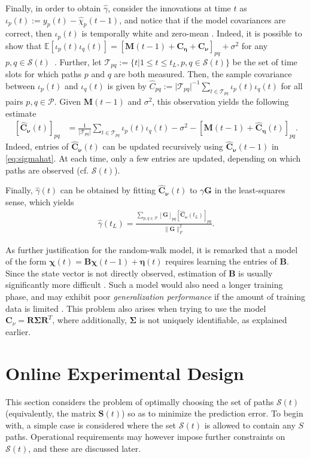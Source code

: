 \documentclass[draftcls,onecolumn,12pt]{IEEEtran}
\providecommand{\abs}[1]{\lvert#1\rvert}												\renewcommand{\b}[1]{\ensuremath{\mathbf{#1}}}		 							\newcommand{\bs}[1]{\ensuremath{\boldsymbol{#1}}}		 						\renewcommand{\c}[1]{\ensuremath{\mathcal{#1}}} 								\newcommand{\E}[1]{\ensuremath{\mathbb{E}\left[#1\right]}} 		  \newcommand{\Es}[1]{\ensuremath{\mathbb{E}^{*}\left[#1\right]}} \newcommand{\ind}{1\hspace{-1.6mm}1}														\newcommand{\norm}[1]{\ensuremath{\left\|#1\right\|}}						\newcommand{\tb}[1]{\ensuremath{\tilde{\mathbf{#1}}}}		 				\newcommand{\mat}[1]{\ensuremath{\begin{bmatrix}#1\end{bmatrix}}}
\def \ypt {{y_p(t)}}
\def \bnu {{\bs{\nu}}}
\def \ceta {{\b{C}_{\bs{\eta}}}}
\def \cnu {{\b{C}_{\bs{\nu}}}}
\def \cSt {{\c{S}(t)}}
\def \St {{\b{S}(t)}}
\theoremstyle{plain}\newtheorem{thm}{Theorem}
\theoremstyle{definition}
\theoremstyle{remark}
\begin{document}
Finally, in order to obtain $\hat{\gamma}$, consider the innovations at time $t$ as $\iota_p(t) := \ypt - \hat{\chi}_p(t-1)$, and notice that if the model covariances are correct, then $\iota_p(t)$ is temporally white and zero-mean \cite{Mehra70}.
Indeed, it is possible to show that $\E{\iota_p(t)\iota_q(t)} = \left[\b{M}(t-1)+\ceta+\cnu\right]_{pq}+\sigma^2$ for any $p,q \in \cSt$~\cite{Myers76}.
Further, let $\c{T}_{pq}:=\{t | 1 \leq t \leq t_L, p,q \in \cSt\}$ be the set of time slots for which paths $p$ and $q$ are both measured. 
Then, the sample covariance between $\iota_p(t)$ and $\iota_q(t)$ is given by $\hat{C}_{pq} := \abs{\c{T}_{pq}}^{-1}\sum_{t \in \c{T}_{pq}}\iota_p(t)\iota_q(t)$ for all pairs $p,q \in \c{P}$.
Given $\b{M}(t-1)$ and $\sigma^2$, this observation yields the following estimate
\begin{align}
\left[\widehat{\b{C}}_{\bnu}(t)\right]_{pq} &= \frac{1}{\abs{\c{T}_{pq}}}\sum_{t\in \c{T}_{pq}}\iota_p(t)\iota_q(t) - \sigma^2 - [\b{M}(t-1) + \widehat{\b{C}}_{\bs{\eta}}(t)]_{pq} \label{eq:sigmahat}.
\end{align}
Indeed, entries of $\widehat{\b{C}}_{\bnu}(t)$ can be updated recursively using $\widehat{\b{C}}_{\bnu}(t-1)$ in \eqref{eq:sigmahat}. 
At each time, only a few entries are updated, depending on which paths are observed (cf. $\cSt$). 

Finally, $\hat{\gamma}(t)$ can be obtained by fitting $\widehat{\b{C}}_{\bnu}(t)$ to $\gamma\b{G}$ in the least-squares sense, which yields
\begin{align}
\hat{\gamma}(t_L) = \frac{\sum_{p,q \in \c{P}}[\b{G}]_{pq}[\widehat{\b{C}}_{\bnu}(t_L)]_{pq}}{\|\b{G}\|_F^2}.
\end{align}

{ As further justification for the random-walk model, it is remarked that a model of the form $\bs{\chi}(t) = \bs{B}\bs{\chi}(t-1) + \bs{\eta}(t)$ requires learning the entries of $\bs{B}$. Since the state vector is not directly observed, estimation of $\bs{B}$ is usually significantly more difficult \cite{AnM79, gg96, gg96-2}. Such a model would also need a longer training phase, and may exhibit poor \emph{generalization performance} if the amount of training data is limited \cite{bishop}. This problem also arises when trying to use the model $\mathbf{C}_\nu = \mathbf{R} \mathbf{\Sigma}\mathbf{R}^T$, where additionally, $\bs{\Sigma}$ is not uniquely identifiable, as explained earlier.}

\section{Online Experimental Design} \label{expdesign}
This section considers the problem of optimally choosing the set of paths $\cSt$ (equivalently, the matrix $\St$) so as to minimize the prediction error. 
To begin with, a simple case is considered where the set $\cSt$ is allowed to contain any $S$ paths. 
Operational requirements may however impose further constraints on $\cSt$, and these are discussed later. 
\end{document}
